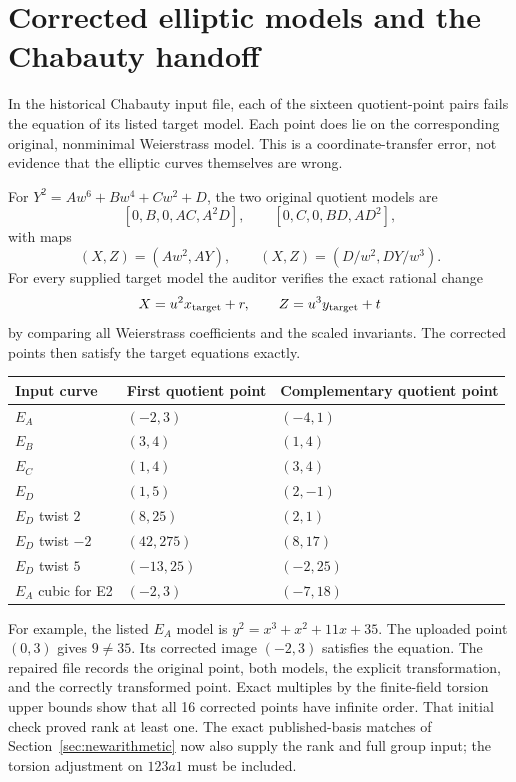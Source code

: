 \documentclass[11pt,letterpaper]{article}
\renewcommand{\arraystretch}{1.12}
\theoremstyle{definition}\newtheorem{definition}[theorem]{Definition}
\theoremstyle{remark}\newtheorem{remark}[theorem]{Remark}
\begin{document}
\section{Corrected elliptic models and the Chabauty handoff}\label{sec:models}
In the historical Chabauty input file, each of the sixteen quotient-point pairs fails the equation of its listed target model. Each point does lie on the corresponding original, nonminimal Weierstrass model. This is a coordinate-transfer error, not evidence that the elliptic curves themselves are wrong.

For $Y^2=A w^6+B w^4+Cw^2+D$, the two original quotient models are
\[
[0,B,0,AC,A^2D],\qquad [0,C,0,BD,AD^2],
\]
with maps
\[
(X,Z)=(Aw^2,AY),\qquad (X,Z)=(D/w^2,DY/w^3).
\]
For every supplied target model the auditor verifies the exact rational change
\[
X=u^2x_{\rm target}+r,\qquad Z=u^3y_{\rm target}+t
\]
by comparing all Weierstrass coefficients and the scaled invariants. The corrected points then satisfy the target equations exactly.

\begin{center}
\small\renewcommand{\arraystretch}{1.15}
\begin{tabular}{lll}
\toprule
Input curve & First quotient point & Complementary quotient point\\
\midrule
$E_A$ & $(-2,3)$ & $(-4,1)$\\
$E_B$ & $(3,4)$ & $(1,4)$\\
$E_C$ & $(1,4)$ & $(3,4)$\\
$E_D$ & $(1,5)$ & $(2,-1)$\\
$E_D$ twist $2$ & $(8,25)$ & $(2,1)$\\
$E_D$ twist $-2$ & $(42,275)$ & $(8,17)$\\
$E_D$ twist $5$ & $(-13,25)$ & $(-2,25)$\\
$E_A$ cubic for E2 & $(-2,3)$ & $(-7,18)$\\
\bottomrule
\end{tabular}
\end{center}
For example, the listed $E_A$ model is $y^2=x^3+x^2+11x+35$. The uploaded point $(0,3)$ gives $9\ne35$. Its corrected image $(-2,3)$ satisfies the equation. The repaired file records the original point, both models, the explicit transformation, and the correctly transformed point. Exact multiples by the finite-field torsion upper bounds show that all 16 corrected points have infinite order. That initial check proved rank at least one. The exact published-basis matches of Section~\ref{sec:newarithmetic} now also supply the rank and full group input; the torsion adjustment on $123a1$ must be included.
\end{document}
